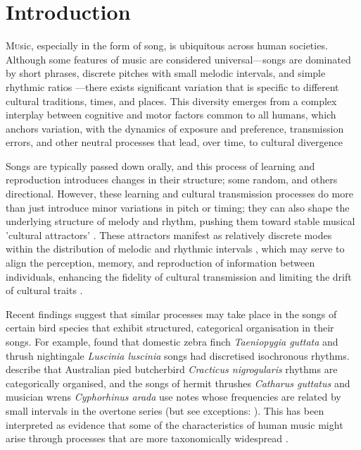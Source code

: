 \section{Introduction}

\lettrine[lines=2]Music, especially in the form of song, is ubiquitous across human societies. Although some features of music are considered universal---songs are dominated by short phrases, discrete pitches with small melodic intervals, and simple rhythmic ratios \autocite{mehr2019, savage2015}---there exists significant variation that is specific to different cultural traditions, times, and places. This diversity emerges from a complex interplay between cognitive and motor factors common to all humans, which anchors variation, with the dynamics of exposure and preference, transmission errors, and other neutral processes that lead, over time, to cultural divergence \autocite{tchernichovski2017,verhoef2021,tierney2011,savage2019,savage2019} 

Songs are typically passed down orally, and this process of learning and reproduction introduces changes in their structure; some random, and others directional. However, these learning and cultural transmission processes do more than just introduce minor variations in pitch or timing; they can also shape the underlying structure of melody and rhythm, pushing them toward stable musical 'cultural attractors' \autocite{claidiere2007, buskell2017}. These attractors manifest as relatively discrete modes within the distribution of melodic and rhythmic intervals \autocite{anglada-tort2023, verhoef2021, jacoby2021}, which may serve to align the perception, memory, and reproduction of information between individuals, enhancing the fidelity of cultural transmission and limiting the drift of cultural traits \autocite{anglada-tort2023, heyes2018a, feher2009, saldana2019, trehub2015, falandays2022}.

Recent findings suggest that similar processes may take place in the songs of certain bird species that exhibit structured, categorical organisation in their songs. For example, \textcite{roeske2020} found that domestic zebra finch \textit{Taeniopygia guttata} and thrush nightingale \textit{Luscinia luscinia} songs had discretised isochronous rhythms. \textcite{xing2022} describe that Australian pied butcherbird \textit{Cracticus nigrogularis} rhythms are categorically organised, and the songs of hermit thrushes \textit{Catharus guttatus} \autocite{doolittle2014} and musician wrens \textit{Cyphorhinus arada} \autocite{doolittle2012} use notes whose frequencies are related by small intervals in the overtone series (but see exceptions: \cite{araya-salas2012, dobson1977}). This has been interpreted as evidence that some of the characteristics of human music might arise through processes that are more taxonomically widespread \autocite{doolittle2014}.


